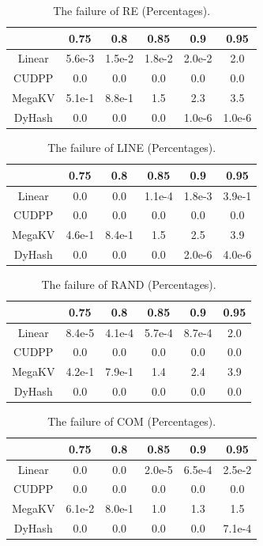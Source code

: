 \begin{table}[H]
	\caption{The failure of RE (Percentages).}
	\centering
    \begin{tabular}{|c|c|c|c|c|c|}
		\hline
		           & 0.75 & 0.8 & 0.85 & 0.9 & 0.95\\ \hline
		Linear &5.6e-3 & 1.5e-2 &1.8e-2  & 2.0e-2 & 2.0 \\ \hline
		CUDPP & 0.0 & 0.0 &0.0  & 0.0 & 0.0 \\ \hline
		MegaKV &5.1e-1 & 8.8e-1 &1.5  & 2.3 & 3.5 \\ \hline
		DyHash &0.0 & 0.0 &0.0  & 1.0e-6 & 1.0e-6 \\ \hline
	\end{tabular}
	\label{tab:fail:re}
\end{table}

\begin{table}[H]
	\caption{The failure of LINE (Percentages).}
	\centering
	\begin{tabular}{|c|c|c|c|c|c|}
		\hline
		           & 0.75 & 0.8 & 0.85 & 0.9 & 0.95\\ \hline
		Linear &0.0 & 0.0 &1.1e-4  & 1.8e-3 & 3.9e-1 \\ \hline
		CUDPP & 0.0 & 0.0 &0.0  & 0.0 & 0.0 \\ \hline
		MegaKV &4.6e-1 & 8.4e-1 &1.5  & 2.5 & 3.9 \\ \hline
		DyHash &0.0 & 0.0 &0.0  & 2.0e-6 & 4.0e-6 \\ \hline
	\end{tabular}
	\label{tab:fail:line}
\end{table}

\begin{table}[H]
	\caption{The failure of RAND (Percentages).}
	\centering
	\begin{tabular}{|c|c|c|c|c|c|}
		\hline
		           & 0.75 & 0.8 & 0.85 & 0.9 & 0.95\\ \hline
		Linear &8.4e-5 & 4.1e-4 &5.7e-4  & 8.7e-4 & 2.0 \\ \hline
		CUDPP & 0.0 & 0.0 &0.0  & 0.0 & 0.0 \\ \hline
		MegaKV &4.2e-1 & 7.9e-1 &1.4  & 2.4 & 3.9 \\ \hline
		DyHash &0.0 & 0.0 &0.0  & 0.0 & 0.0 \\ \hline
	\end{tabular}
	\label{tab:fail:rand}
\end{table}

\begin{table}[H]
	\caption{The failure of COM (Percentages).}
	\centering
	\begin{tabular}{|c|c|c|c|c|c|}
		\hline
		           & 0.75 & 0.8 & 0.85 & 0.9 & 0.95\\ \hline
		Linear &0.0 & 0.0 &2.0e-5  & 6.5e-4 & 2.5e-2 \\ \hline
		CUDPP & 0.0 & 0.0 &0.0  & 0.0 & 0.0 \\ \hline
		MegaKV &6.1e-2 & 8.0e-1 &1.0  & 1.3 & 1.5 \\ \hline
		DyHash &0.0 & 0.0 &0.0  & 0.0 & 7.1e-4 \\ \hline
	\end{tabular}
	\label{tab:fail:com}
\end{table}


